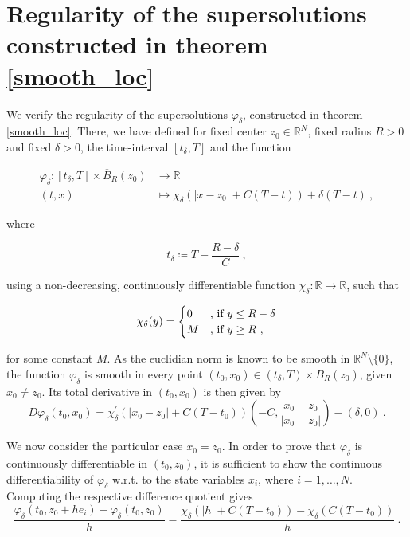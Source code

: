\section{Regularity of the supersolutions constructed in theorem \ref{smooth_loc}}
\label{smoothness_supersolutions}

We verify the regularity of the supersolutions $ \varphi_{\delta} $, constructed in theorem \ref{smooth_loc}. There, we have defined for fixed center $ z_0 \in \mathbb{R}^N $, fixed radius $ R > 0 $ and fixed $ \delta > 0 $, the time-interval $ \left[t_{\delta}, T \right] $ and the function

\begin{align*}
\varphi_{\delta} : \left[t_{\delta}, T \right] \times \overline{B}_{R}(z_0) &\to \mathbb{R} \\ 
(t, x) &\mapsto \chi_{\delta}(\lvert x - z_0 \rvert + C (T - t)) + \delta(T - t) \ ,
\end{align*}

where

\begin{equation*}
	t_{\delta} \coloneqq T - \frac{R - \delta}{C} \ ,
\end{equation*}

using a non-decreasing, continuously differentiable function $ \chi_{\delta} : \mathbb{R} \to \mathbb{R} $, such that

\begin{align*}
\chi_{\delta}(y) = \begin{cases}
0 &\hbox{, if } y \leq R - \delta \\
M &\hbox{, if }y \geq R \ ,
\end{cases} 
\end{align*}

for some constant $ M $. As the euclidian norm is known to be smooth in $ \mathbb{R}^N \setminus \{ 0 \} $, the function $ \varphi_{\delta} $ is smooth in every point $ (t_0, x_0) \in \left(t_{\delta}, T \right) \times B_R(z_0) $, given $ x_0 \neq z_0 $. Its total derivative in $ (t_0, x_0) $ is then given by
\begin{equation*}
	D \varphi_{\delta}(t_0, x_0) = \chi_{\delta}^{\prime}\left(\lvert x_0 - z_0 \rvert + C(T - t_0)\right)\left(- C, \frac{x_0 - z_0}{\lvert x_0 - z_0 \rvert}\right) - \left(\delta, 0 \right) \ .
\end{equation*}

We now consider the particular case $ x_0 = z_0 $. In order to prove that $ \varphi_{\delta} $ is continuously differentiable in $ (t_0, z_0) $, it is sufficient to show the continuous differentiability of $ \varphi_{\delta} $ w.r.t. to the state variables $ x_i $, where $ i = 1, \ldots, N $. Computing the respective difference quotient gives
\begin{equation*}
	\frac{\varphi_{\delta}(t_0, z_0 + h e_i) - \varphi_{\delta}(t_0, z_0)}{h} = \frac{\chi_{\delta}(\lvert h \rvert + C(T - t_0)) - \chi_{\delta}(C(T - t_0))}{h} \ .
\end{equation*}

